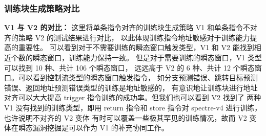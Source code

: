 \begin{table}[h!]
    \begin{center} 
    \caption{V3 瞬态窗口统计} 
    \label{table:v3-trans}  
    \end{center}
\end{table}

\subsubsection{训练块生成策略对比}

\textbf{V1 与 V2 的对比：}
这里将单条指令对齐的训练块生成策略 V1 和单条指令不对齐的策略 V2 的测试结果进行对比，
以此体现训练指令地址敏感对于训练能力提高的重要性。
可以看到对于不需要训练的瞬态窗口触发类型，V1 和 V2 能找到相近个数的瞬态窗口，训练能力保持一致。
但是对于需要训练的瞬态窗口，V1 类型可以找到 10 种、共计 106 个瞬态窗口，
远远高于 V2 的 6 种、共计 12 个瞬态窗口。可以看到控制流类型的瞬态窗口触发指令，
如分支预测错误、跳转目标预测错误、返回地址预测错误类型的训练是地址敏感的，
有意识地让训练块进行地址对齐可以大大提高 trigger 指令训练的成功率。但我们也可以看到 V2 找到了
两种 V1 没有找到的训练类型，即用 return 指令和 store 指令对 spectre-v4 进行训练，也许说明不对齐的 V2 变体
有时可以覆盖一些极其罕见的训练情况，故而 V2 变体在瞬态漏洞挖掘是可以作为 V1 的补充协同工作。\par

